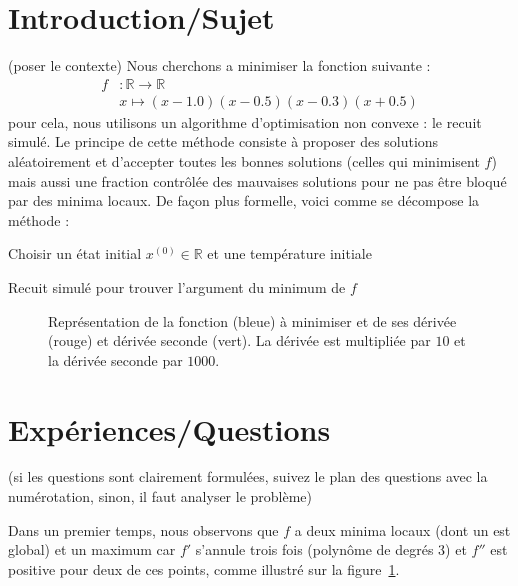 \documentclass[10pt,a4paper]{article}
\begin{document}
\section{Introduction/Sujet} (poser le contexte)
Nous cherchons a minimiser la fonction suivante : 
\begin{align*}
	f &: \mathbb{R} \rightarrow \mathbb{R}\\
	& x \mapsto (x-1.0)(x-0.5)(x-0.3)(x+0.5)
\end{align*}
pour cela, nous utilisons un algorithme d'optimisation non convexe : le recuit simulé. Le principe de cette méthode consiste à proposer des solutions aléatoirement et d'accepter toutes les bonnes solutions (celles qui minimisent $f$) mais aussi une fraction contrôlée des mauvaises solutions pour ne pas être bloqué par des minima locaux. De façon plus formelle, voici comme se décompose la méthode : 
\begin{algorithm}[h]
	Choisir un état initial $x^{\left(\!0\!\right)}\in\mathbb{R}$ et une température initiale\newline
	\caption{Recuit simulé pour trouver l'argument du minimum de $f$}
	\label{SA}
\end{algorithm}
\begin{figure}[h]
	\centering
	\scalebox{0.8}{}
	\caption{Représentation de la fonction (bleue) à minimiser et de ses dérivée (rouge) et dérivée seconde (vert). La dérivée est multipliée par $10$ et la dérivée seconde par $1000$.}
	\label{fonction}
\end{figure}

\section{Expériences/Questions}(si les questions sont clairement formulées, suivez le plan des questions avec la numérotation, sinon, il faut analyser le problème)

Dans un premier temps, nous observons que $f$ a deux minima locaux (dont un est global) et un maximum car $f'$ s'annule trois fois (polynôme de degrés 3) et $f''$ est positive pour deux de ces points, comme illustré sur la figure~\ref{fonction}.
\end{document}

